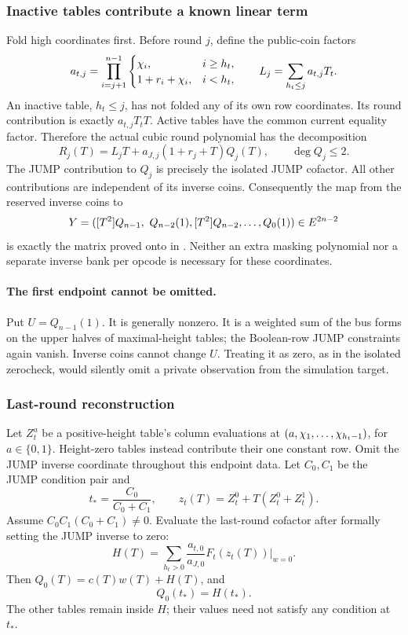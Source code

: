 \subsubsection{Inactive tables contribute a known linear term}

Fold high coordinates first. Before round $j$, define the public-coin factors
\[
 a_{t,j}=\prod_{i=j+1}^{n-1}
 \begin{cases}
 \chi_i,&i\ge h_t,\\
 1+r_i+\chi_i,&i<h_t,
 \end{cases}
 \qquad
 L_j=\sum_{h_t\le j}a_{t,j}T_t.
\]
An inactive table, $h_t\le j$, has not folded any of its own row coordinates. Its round contribution is exactly $a_{t,j}T_t T$. Active tables have the common current equality factor. Therefore the actual cubic round polynomial has the decomposition
\begin{equation}\label{eq:batch-round}
 R_j(T)=L_jT+a_{J,j}(1+r_j+T)Q_j(T),\qquad\deg Q_j\le2.
\end{equation}
The JUMP contribution to $Q_j$ is precisely the isolated JUMP cofactor. All other contributions are independent of its inverse coins. Consequently the map from the reserved inverse coins to
\[
 Y=( [T^2]Q_{n-1},\ Q_{n-2}(1),[T^2]Q_{n-2},\ldots,Q_0(1))
 \in\E^{2n-2}
\]
is exactly the matrix proved onto in . Neither an extra masking polynomial nor a separate inverse bank per opcode is necessary for these coordinates.

\paragraph{The first endpoint cannot be omitted.} Put $U=Q_{n-1}(1)$. It is generally nonzero. It is a weighted sum of the bus forms on the upper halves of maximal-height tables; the Boolean-row JUMP constraints again vanish. Inverse coins cannot change $U$. Treating it as zero, as in the isolated zerocheck, would silently omit a private observation from the simulation target.

\subsubsection{Last-round reconstruction}

Let $Z_t^a$ be a positive-height table's column evaluations at $(a,\chi_1,\ldots,\chi_{h_t-1})$, for $a\in\{0,1\}$. Height-zero tables instead contribute their one constant row. Omit the JUMP inverse coordinate throughout this endpoint data. Let $C_0,C_1$ be the JUMP condition pair and
\[
 t_* = \frac{C_0}{C_0+C_1},\qquad
 z_t(T)=Z_t^0+T(Z_t^0+Z_t^1).
\]
Assume $C_0C_1(C_0+C_1)\ne0$. Evaluate the last-round cofactor after formally setting the JUMP inverse to zero:
\[
 H(T)=\sum_{h_t>0}\frac{a_{t,0}}{a_{J,0}}
 F_t(z_t(T))\big|_{w=0}.
\]
Then $Q_0(T)=c(T)w(T)+H(T)$, and
\begin{equation}\label{eq:batch-root}
 Q_0(t_*)=H(t_*).
\end{equation}
The other tables remain inside $H$; their values need not satisfy any condition at $t_*$.

